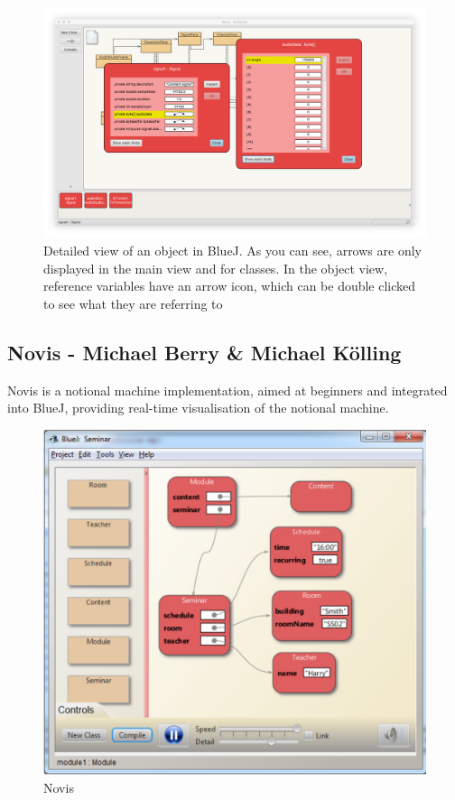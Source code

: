 \documentclass[]{usiinfbachelorproject}
\begin{document}
\begin{figure}[h!]
\centering
\includegraphics[width=\textwidth]{figures/bluej_objects_open.png}
\caption {Detailed view of an object in BlueJ. As you can see, arrows are only displayed in the main view and for classes. In the object view, reference variables have an arrow icon, which can be double clicked to see what they are referring to}
\label {bluej_objects_open}
\end{figure}

\subsection{Novis - Michael Berry \& Michael K\"{o}lling}

Novis \cite{7743153} is a notional machine implementation, aimed at beginners and integrated into BlueJ, providing real-time visualisation of the notional machine.

\begin{figure}[h!]
\centering
\includegraphics[scale=0.4]{figures/Novis.png}
\caption {Novis}
\end{figure}
\end{document}
